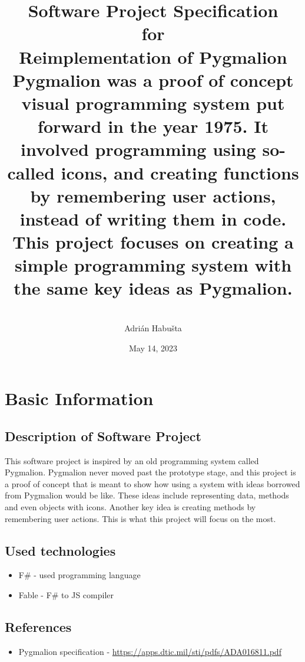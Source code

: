 \documentclass{article}
\author{%
    \vspace{3.5mm}\currentversion\\
    Adrián Habušta
    }
\title{%
    \LARGE Software Project Specification \\
    \Large for \\
    \Huge Reimplementation of Pygmalion \\\vspace{10mm}
    \normalsize Pygmalion was a proof of concept visual programming system
    put forward in the year 1975. It involved programming using so-called
    icons, and creating functions by remembering user actions, instead of
    writing them in code. This project focuses on creating a simple programming
    system with the same key ideas as Pygmalion.
    }
\date{May 14, 2023}
\begin{document}
    \begin{titlepage}
        \maketitle
    \end{titlepage}

    \tableofcontents
    \newpage

    \section{Basic Information}
        \subsection{Description of Software Project}
            This software project is inspired by an old programming system called Pygmalion.
            Pygmalion never moved past the prototype stage, and this project is a proof of concept that is meant
            to show how using a system with ideas borrowed from Pygmalion would be like. These ideas include
            representing data, methods and even objects with icons. Another key idea is creating methods by remembering
            user actions. This is what this project will focus on the most.

        \subsection{Used technologies}
            \begin{itemize}
                \item
                    F\# - used programming language
                \item
                    Fable - F\# to JS compiler

            \end{itemize}

        \subsection{References}
            \begin{itemize}

                \item
                    Pygmalion specification
                    \subitem
                        - \url{https://apps.dtic.mil/sti/pdfs/ADA016811.pdf}

            \end{itemize}
\end{document}
